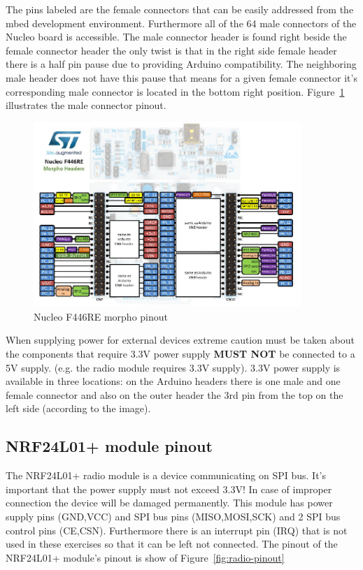 \documentclass[a4paper]{article}
\begin{document}
The pins labeled are the female connectors that can be easily addressed from the mbed development environment.
Furthermore all of the 64 male connectors of the Nucleo board is accessible. The male connector header is found right beside the female connector header the only twist is that in the right side female header there is a half pin pause due to providing Arduino compatibility. The neighboring male header does not have this pause that means for a given female connector it's corresponding male connector is located in the bottom right position.
Figure~\ref{fig:nucleo-pinout-morpho} illustrates the male connector pinout.

\begin{figure}[H]
    \centering
    \includegraphics[width=0.9\textwidth]{figures/nucleo-morpho-pinout.png}
    \caption{Nucleo F446RE morpho pinout}
    \label{fig:nucleo-pinout-morpho}
\end{figure}

When supplying power for external devices extreme caution must be taken about the components that require 3.3V power supply \textbf{MUST NOT} be connected to a 5V supply. (e.g. the radio module requires 3.3V supply).
3.3V power supply is available in three locations: on the Arduino headers there is one male and one female connector and also on the outer header the 3rd pin from the top on the left side (according to the image).

\subsection{NRF24L01+ module pinout}

The NRF24L01+ radio module is a device communicating on SPI bus. It's important that the power supply must not exceed 3.3V!
In case of improper connection the device will be damaged permanently.
This module has power supply pins (GND,VCC) and SPI bus pins (MISO,MOSI,SCK) and 2 SPI bus control pins (CE,CSN). Furthermore there is an interrupt pin (IRQ) that is not used in these exercises so that it can be left not connected.
The pinout of the NRF24L01+ module's pinout is show of Figure~\ref{fig:radio-pinout}
\end{document}
